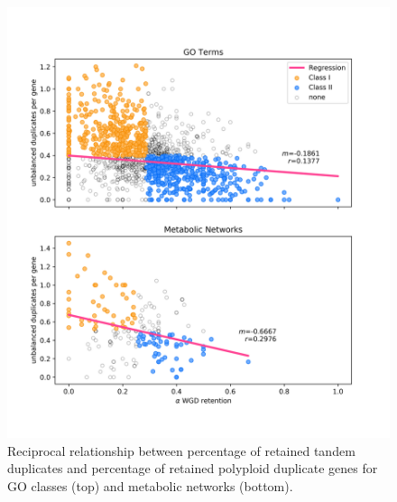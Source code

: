 \documentclass[11pt]{article}
\begin{document}
\begin{figure}[h!]
    \includegraphics[width=\linewidth]{../figures/dup_history_GO_and_MN.png}
 \caption{Reciprocal relationship between percentage of retained tandem duplicates and percentage of retained polyploid duplicate genes for GO classes (top) and metabolic networks (bottom).}
  \label{fig1}
\end{figure}



\end{document}
